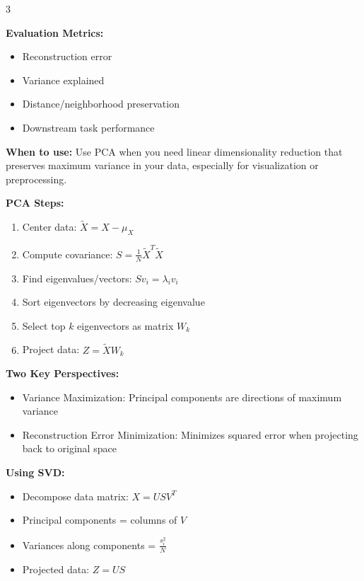 \documentclass[10pt,landscape]{article}
\begin{document}
\begin{multicols}{3}
\begin{tcolorbox}[breakable, title=7. Dimensionality Reduction Concepts, colback=dimension]
\textbf{Evaluation Metrics:}
\begin{itemize}[leftmargin=*,noitemsep,topsep=0pt]
    \item Reconstruction error
    \item Variance explained
    \item Distance/neighborhood preservation
    \item Downstream task performance
\end{itemize}
\end{tcolorbox}

\begin{tcolorbox}[breakable, title=7.1 Principal Component Analysis (PCA), colback=dimension]
\textbf{When to use:} Use PCA when you need linear dimensionality reduction that preserves maximum variance in your data, especially for visualization or preprocessing.

\textbf{PCA Steps:}
\begin{enumerate}[leftmargin=*,noitemsep,topsep=0pt]
    \item Center data: $\tilde{X} = X - \mu_X$
    \item Compute covariance: $S = \frac{1}{N}\tilde{X}^T\tilde{X}$
    \item Find eigenvalues/vectors: $S v_i = \lambda_i v_i$
    \item Sort eigenvectors by decreasing eigenvalue
    \item Select top $k$ eigenvectors as matrix $W_k$
    \item Project data: $Z = \tilde{X}W_k$
\end{enumerate}

\textbf{Two Key Perspectives:}
\begin{itemize}[leftmargin=*,noitemsep,topsep=0pt]
    \item Variance Maximization: Principal components are directions of maximum variance
    \item Reconstruction Error Minimization: Minimizes squared error when projecting back to original space
\end{itemize}

\textbf{Using SVD:}
\begin{itemize}[leftmargin=*,noitemsep,topsep=0pt]
    \item Decompose data matrix: $X = USV^T$
    \item Principal components = columns of $V$
    \item Variances along components = $\frac{s_i^2}{N}$
    \item Projected data: $Z = US$
\end{itemize}


\end{tcolorbox}
\end{multicols}
\end{document}
